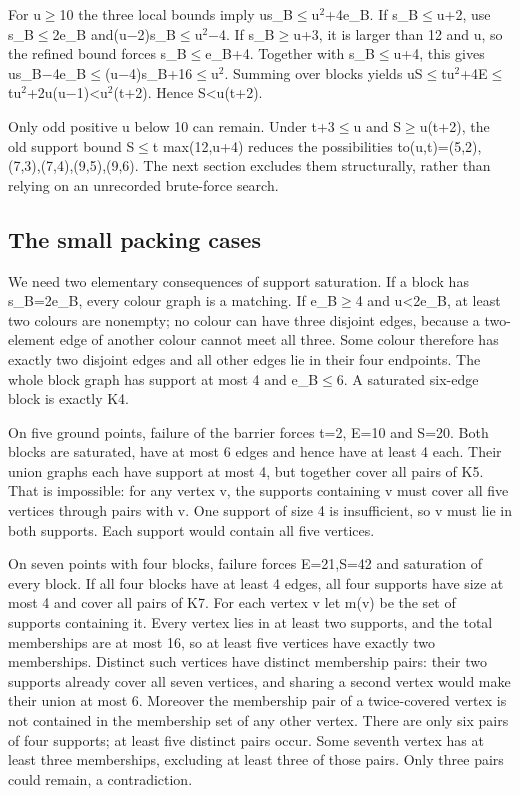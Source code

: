 \documentclass[11pt,a4paper]{article}
\begin{document}
For u\ensuremath{\geq}10 the three local bounds imply us\_B\ensuremath{\leq}u\ensuremath{^2}+4e\_B. If s\_B\ensuremath{\leq}u+2, use s\_B\ensuremath{\leq}2e\_B and(u\ensuremath{-}2)s\_B\ensuremath{\leq}u\ensuremath{^2}\ensuremath{-}4. If s\_B\ensuremath{\geq}u+3, it is larger than 12 and u, so the refined bound forces s\_B\ensuremath{\leq}e\_B+4. Together with s\_B\ensuremath{\leq}u+4, this gives us\_B\ensuremath{-}4e\_B\ensuremath{\leq}(u\ensuremath{-}4)s\_B+16\ensuremath{\leq}u\ensuremath{^2}. Summing over blocks yields uS\ensuremath{\leq}tu\ensuremath{^2}+4E\ensuremath{\leq}tu\ensuremath{^2}+2u(u\ensuremath{-}1)<u\ensuremath{^2}(t+2). Hence S<u(t+2).

Only odd positive u below 10 can remain. Under t+3\ensuremath{\leq}u and S\ensuremath{\geq}u(t+2), the old support bound S\ensuremath{\leq}t max(12,u+4) reduces the possibilities to(u,t)=(5,2),(7,3),(7,4),(9,5),(9,6). The next section excludes them structurally, rather than relying on an unrecorded brute-force search.

\subsection{The small packing cases}
We need two elementary consequences of support saturation. If a block has s\_B=2e\_B, every colour graph is a matching. If e\_B\ensuremath{\geq}4 and u<2e\_B, at least two colours are nonempty; no colour can have three disjoint edges, because a two-element edge of another colour cannot meet all three. Some colour therefore has exactly two disjoint edges and all other edges lie in their four endpoints. The whole block graph has support at most 4 and e\_B\ensuremath{\leq}6. A saturated six-edge block is exactly K4.

On five ground points, failure of the barrier forces t=2, E=10 and S=20. Both blocks are saturated, have at most 6 edges and hence have at least 4 each. Their union graphs each have support at most 4, but together cover all pairs of K5. That is impossible: for any vertex v, the supports containing v must cover all five vertices through pairs with v. One support of size 4 is insufficient, so v must lie in both supports. Each support would contain all five vertices.

On seven points with four blocks, failure forces E=21,S=42 and saturation of every block. If all four blocks have at least 4 edges, all four supports have size at most 4 and cover all pairs of K7. For each vertex v let m(v) be the set of supports containing it. Every vertex lies in at least two supports, and the total memberships are at most 16, so at least five vertices have exactly two memberships. Distinct such vertices have distinct membership pairs: their two supports already cover all seven vertices, and sharing a second vertex would make their union at most 6. Moreover the membership pair of a twice-covered vertex is not contained in the membership set of any other vertex. There are only six pairs of four supports; at least five distinct pairs occur. Some seventh vertex has at least three memberships, excluding at least three of those pairs. Only three pairs could remain, a contradiction.
\end{document}
